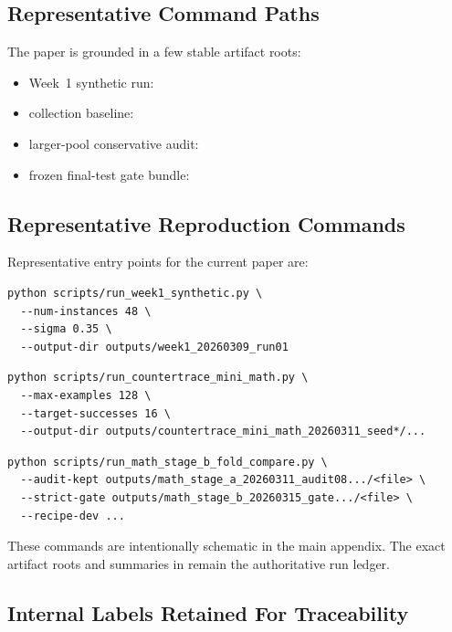 \subsection{Representative Command Paths}

The paper is grounded in a few stable artifact roots:

\begin{itemize}
  \item Week~1 synthetic run: 
  \item collection baseline: 
  \item larger-pool conservative audit: 
  \item frozen final-test gate bundle: 
\end{itemize}

\subsection{Representative Reproduction Commands}

Representative entry points for the current paper are:

\begin{verbatim}
python scripts/run_week1_synthetic.py \
  --num-instances 48 \
  --sigma 0.35 \
  --output-dir outputs/week1_20260309_run01
\end{verbatim}

\begin{verbatim}
python scripts/run_countertrace_mini_math.py \
  --max-examples 128 \
  --target-successes 16 \
  --output-dir outputs/countertrace_mini_math_20260311_seed*/...
\end{verbatim}

\begin{verbatim}
python scripts/run_math_stage_b_fold_compare.py \
  --audit-kept outputs/math_stage_a_20260311_audit08.../<file> \
  --strict-gate outputs/math_stage_b_20260315_gate.../<file> \
  --recipe-dev ...
\end{verbatim}

These commands are intentionally schematic in the main appendix. The exact artifact roots and summaries in  remain the authoritative run ledger.

\subsection{Internal Labels Retained For Traceability}

